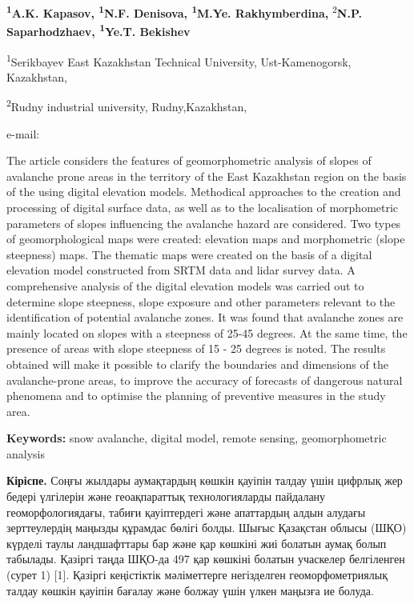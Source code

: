 {\bfseries \textsuperscript{1}A.K. Kapasov, \textsuperscript{1}N.F.
Denisova, \textsuperscript{1}M.Ye. Rakhymberdina\textsuperscript{\envelope },}
\textsuperscript{2}{\bfseries N.P. Saparhodzhaev, \textsuperscript{1}Ye.T.
Bekishev}

\textsuperscript{1}Serikbayev East Kazakhstan Technical University,
Ust-Kamenogorsk, Kazakhstan,

\textsuperscript{2}Rudny industrial university, Rudny,Kazakhstan,

e-mail:
\href{mailto:MRahymberdina@edu.ektu.kz}{}

The article considers the features of geomorphometric analysis of slopes
of avalanche prone areas in the territory of the East Kazakhstan region
on the basis of the using digital elevation models. Methodical
approaches to the creation and processing of digital surface data, as
well as to the localisation of morphometric parameters of slopes
influencing the avalanche hazard are considered. Two types of
geomorphological maps were created: elevation maps and morphometric
(slope steepness) maps. The thematic maps were created on the basis of a
digital elevation model constructed from SRTM data and lidar survey
data. A comprehensive analysis of the digital elevation models was
carried out to determine slope steepness, slope exposure and other
parameters relevant to the identification of potential avalanche zones.
It was found that avalanche zones are mainly located on slopes with a
steepness of 25-45 degrees. At the same time, the presence of areas with
slope steepness of 15 - 25 degrees is noted. The results obtained will
make it possible to clarify the boundaries and dimensions of the
avalanche-prone areas, to improve the accuracy of forecasts of dangerous
natural phenomena and to optimise the planning of preventive measures in
the study area.

{\bfseries Keywords:} snow avalanche, digital model, remote sensing,
geomorphometric analysis

{\bfseries Кіріспе.} Соңғы жылдары аумақтардың көшкін қауіпін талдау үшін
цифрлық жер бедері үлгілерін және геоақпараттық технологияларды
пайдалану геоморфологиядағы, табиғи қауіптердегі және апаттардың алдын
алудағы зерттеулердің маңызды құрамдас бөлігі болды. Шығыс Қазақстан
облысы (ШҚО) күрделі таулы ландшафттары бар және қар көшкіні жиі болатын
аумақ болып табылады. Қазіргі таңда ШҚО-да 497 қар көшкіні болатын
учаскелер белгіленген (сурет 1) {[}1{]}. Қазіргі кеңістіктік
мәліметтерге негізделген геоморфометриялық талдау көшкін қауіпін бағалау
және болжау үшін үлкен маңызға ие болуда.

